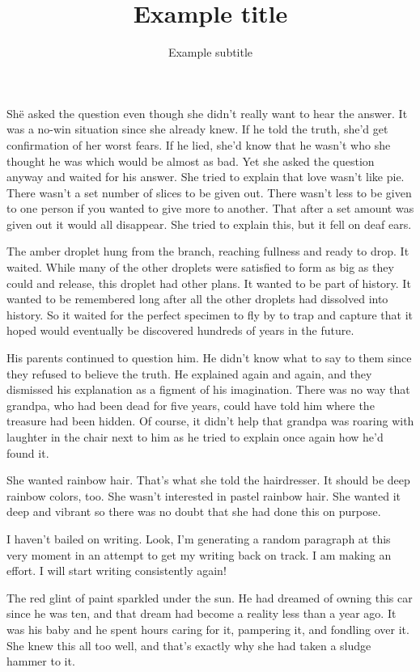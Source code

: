 \documentclass{GEWISDocument}
\title{Example title}
\subtitle{Example subtitle}
\begin{document}
\faHandPointerO

Shë asked the question even though she didn't really want to hear the answer. It was a no-win situation since she already knew. If he told the truth, she'd get confirmation of her worst fears. If he lied, she'd know that he wasn't who she thought he was which would be almost as bad. Yet she asked the question anyway and waited for his answer.
She tried to explain that love wasn't like pie. There wasn't a set number of slices to be given out. There wasn't less to be given to one person if you wanted to give more to another. That after a set amount was given out it would all disappear. She tried to explain this, but it fell on deaf ears.

The amber droplet hung from the branch, reaching fullness and ready to drop. It waited. While many of the other droplets were satisfied to form as big as they could and release, this droplet had other plans. It wanted to be part of history. It wanted to be remembered long after all the other droplets had dissolved into history. So it waited for the perfect specimen to fly by to trap and capture that it hoped would eventually be discovered hundreds of years in the future.

His parents continued to question him. He didn't know what to say to them since they refused to believe the truth. He explained again and again, and they dismissed his explanation as a figment of his imagination. There was no way that grandpa, who had been dead for five years, could have told him where the treasure had been hidden. Of course, it didn't help that grandpa was roaring with laughter in the chair next to him as he tried to explain once again how he'd found it.

She wanted rainbow hair. That's what she told the hairdresser. It should be deep rainbow colors, too. She wasn't interested in pastel rainbow hair. She wanted it deep and vibrant so there was no doubt that she had done this on purpose.

I haven't bailed on writing. Look, I'm generating a random paragraph at this very moment in an attempt to get my writing back on track. I am making an effort. I will start writing consistently again!

The red glint of paint sparkled under the sun. He had dreamed of owning this car since he was ten, and that dream had become a reality less than a year ago. It was his baby and he spent hours caring for it, pampering it, and fondling over it. She knew this all too well, and that's exactly why she had taken a sludge hammer to it.
\end{document}

